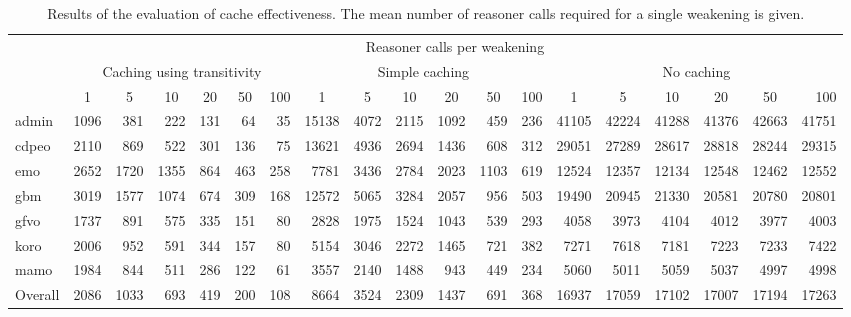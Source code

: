 \begin{table}[htbp]
  \scriptsize
  \begin{widepage}[5cm]
    \centering
    \addtolength{\tabcolsep}{-1mm}
    \begin{tabular}{|l|rrrrrr|rrrrrr|rrrrrr|}
      \cline{2-19}
      \multicolumn{1}{l|}{} & \multicolumn{18}{c|}{\hspace{-9mm}Reasoner calls per weakening} \\
      \multicolumn{1}{l|}{} & \multicolumn{6}{c}{Caching using transitivity} & \multicolumn{6}{c}{Simple caching} & \multicolumn{6}{c|}{No caching} \\
      \multicolumn{1}{l|}{} & \multicolumn{1}{c}{1} & \multicolumn{1}{c}{5} & \multicolumn{1}{c}{10} & \multicolumn{1}{c}{20} & \multicolumn{1}{c}{50} & \multicolumn{1}{c}{100} & \multicolumn{1}{c}{1} & \multicolumn{1}{c}{5} & \multicolumn{1}{c}{10} & \multicolumn{1}{c}{20} & \multicolumn{1}{c}{50} & \multicolumn{1}{c}{100} & \multicolumn{1}{c}{1} & \multicolumn{1}{c}{5} & \multicolumn{1}{c}{10} & \multicolumn{1}{c}{20} & \multicolumn{1}{c}{50} & 100 \\
      \hline
      admin & 1096 & 381 & 222 & 131 & 64 & 35
        & 15138 & 4072 & 2115 & 1092 & 459 & 236
        & 41105 & 42224 & 41288 & 41376 & 42663 & 41751 \\
      cdpeo & 2110 & 869 & 522 & 301 & 136 & 75
        & 13621 & 4936 & 2694 & 1436 & 608 & 312
        & 29051 & 27289 & 28617 & 28818 & 28244 & 29315 \\
      emo & 2652 & 1720 & 1355 & 864 & 463 & 258
        & 7781 & 3436 & 2784 & 2023 & 1103 & 619
        & 12524 & 12357 & 12134 & 12548 & 12462 & 12552 \\
      gbm & 3019 & 1577 & 1074 & 674 & 309 & 168
        & 12572 & 5065 & 3284 & 2057 & 956 & 503
        & 19490 & 20945 & 21330 & 20581 & 20780 & 20801 \\
      gfvo &  1737 & 891 & 575 & 335 & 151 & 80
        & 2828 & 1975 & 1524 & 1043 & 539 & 293
        & 4058 & 3973 & 4104 & 4012 & 3977 & 4003 \\
      koro & 2006 & 952 & 591 & 344 & 157 & 80
        & 5154 & 3046 & 2272 & 1465 & 721 & 382
        & 7271 & 7618 & 7181 & 7223 & 7233 & 7422 \\
      mamo &  1984 & 844 & 511 & 286 & 122 & 61
        & 3557 & 2140 & 1488 & 943 & 449 & 234
        & 5060 & 5011 & 5059 & 5037 & 4997 & 4998 \\
      \hline
      Overall & 2086 & 1033 & 693 & 419 & 200 & 108
        & 8664 & 3524 & 2309 & 1437 & 691 & 368
        & 16937 & 17059 & 17102 & 17007 & 17194 & 17263 \\
      \hline
    \end{tabular}
  \end{widepage}
  \caption{Results of the evaluation of cache effectiveness. The mean number of reasoner calls required for a single weakening is given.}
\end{table}

